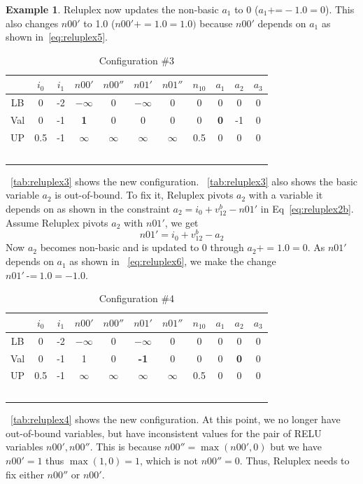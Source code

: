 \documentclass[oneside,11pt,dvipsnames]{book}
\numberwithin{equation}{section}
\theoremstyle{definition}
\newtheorem{example}{Example}[section]
\theoremstyle{remark}
\begin{document}
\begin{example}
Reluplex now updates the non-basic $a_1$ to 0 ($a_1 \text{+=} -1.0 = 0$). This also changes $n00'$  to 1.0 ($n00'+=1.0 = 1.0)$ because $n00'$ depends on $a_1$ as shown in~\autoref{eq:reluplex5}.

\begin{table}[h]
    \centering
\begin{tabular}{ccccccccccc}
     & $i_0$ & $i_1$ & $n00'$ & $n00''$ & $n01'$ & $n01''$ & $n_{10}$ &$a_1$&$a_2$&$a_3$ \\
    \midrule
    LB & 0 & -2 & $-\infty$&0&$-\infty$& 0 & 0 & 0 & 0 &0\\
    Val& 0 & -1 & \textbf{1} & 0 & 0 & 0 & 0 & \textbf{0} & -1 & 0\\
    UP & 0.5 & -1 &$\infty$&$\infty$&$\infty$&$\infty$&0.5& 0 & 0 & 0\\\
\end{tabular}
\caption{Configuration \#3}\label{tab:reluplex3}
\end{table}

~\autoref{tab:reluplex3} shows the new configuration. ~\autoref{tab:reluplex3} also shows the basic variable $a_2$ is out-of-bound.  To fix it, Reluplex pivots $a_2$ with a variable it depends on as shown in the constraint $a_2 = i_0 + v^b_{12} - n01'$ in Eq~\ref{eq:reluplex2b}.  Assume Reluplex pivots $a_2$ with $n01'$, we get
\begin{equation}\label{eq:reluplex6}
  n01' = i_0 + v^b_{12} - a_2
\end{equation}
Now $a_2$ becomes non-basic and is updated to 0 through $a_2+= 1.0 = 0$. As $n01'$ depends on $a_1$ as shown in ~\autoref{eq:reluplex6}, we make the change $n01' ~\texttt{-=}~1.0 = -1.0$.


\begin{table}[h]
    \centering
\begin{tabular}{ccccccccccc}
     & $i_0$ & $i_1$ & $n00'$ & $n00''$ & $n01'$ & $n01''$ & $n_{10}$ &$a_1$&$a_2$&$a_3$ \\
    \midrule
    LB & 0 & -2 & $-\infty$&0&$-\infty$& 0 & 0 & 0 & 0 &0\\
    Val& 0 & -1 & 1 & 0 & \textbf{-1} & 0 & 0 & 0 & \textbf{0} & 0\\
    UP & 0.5 & -1 &$\infty$&$\infty$&$\infty$&$\infty$&0.5& 0 & 0 & 0\\\
\end{tabular}
\caption{Configuration \#4}\label{tab:reluplex4}
\end{table}

~\autoref{tab:reluplex4} shows the new configuration.
At this point, we no longer have out-of-bound variables, but have inconsistent values for the pair of RELU variables $n00', n00''$. This is because $n00'' = \max(n00',0)$ but  we have $n00'=1$ thus $\max(1,0)=1$, which is not $n00''=0$.  Thus, Reluplex needs to fix either $n00''$ or $n00'$.


\end{example}
\end{document}

